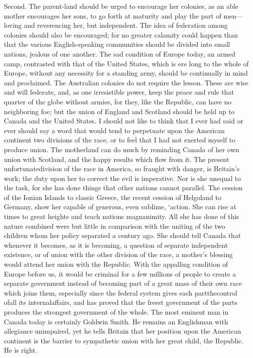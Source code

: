 \documentclass[11pt,openany]{book}
\begin{document}
Second. The parent-land should be urged to encourage her colonies, as an able mother encourages her sons, to go forth at maturity and play the part of men---loving and reverencing her, but independent. The idea of federation among colonies should also be encouraged; for no greater calamity could happen than that the various English-speaking communities should be divided into small nations, jealous of one another. The sad condition of Europe today, an armed camp, contrasted with that of the United States, which is ere long to the whole of Europe, without any necessity for a standing army, should be continually in mind and proclaimed. The Australian colonies do not require the lesson. These are wise and will federate, and, as one irresistible power, keep the peace and rule that quarter of the globe without armies, for they, like the Republic, can have no neighboring foe; but the union of England and Scotland should be held up to Canada and the United States. I should not like to think that I ever had said or ever should say a word that would tend to perpetuate upon the American continent two divisions of the race, or to feel that I had not exerted myself to produce union. The motherland can do much by reminding Canada of her own union with Scotland, and the happy results which flow from it. The present unfortunatedivision of the race in America, so fraught with danger, is Britain's work; the duty upon her to correct the evil is imperative. Nor is she unequal to the task, for she has done things that other nations cannot parallel. The cession of the Ionian Islands to classic Greece, the recent cession of Helgoland to Germany, show her capable of generous, even sublime, `action. She can rise at times to great heights and teach nations magnanimity. All she has done of this nature combined were but little in comparison with the uniting of the two children whom her policy separated a century ago. She should tell Canada that whenever it becomes, as it is becoming, a question of separate independent existence, or of union with the other division of the race, a mother's blessing would attend her union with the Republic. With the appalling condition of Europe before us, it would be criminal for a few millions of people to create a separate government instead of becoming part of a great mass of their own race which joins them, especially since the federal system gives each partthecontrol ofall its internalaffairs, and has proved that the freest government of the parts produces the strongest government of the whole. The most eminent man in Canada today is certainly Goldwin Smith. He remains an Englishman with allegiance unimpaired, yet he tells Britain that her position upon the American continent is the barrier to sympathetic union with her great child, the Republic. He is right.
\end{document}
